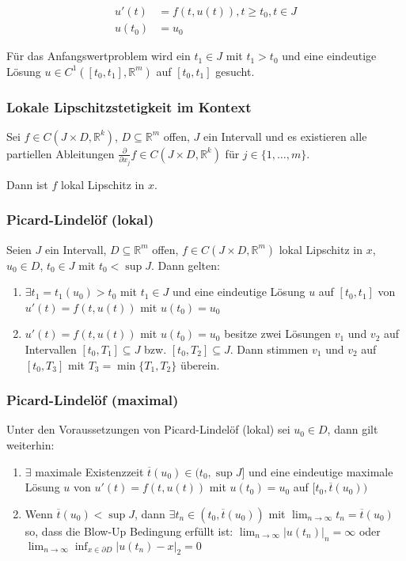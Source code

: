 \vspace*{-4mm}
\begin{align*}
	u'(t)  &= f(t, u(t)), t\geq t_0, t\in J \\
	u(t_0) &= u_0
\end{align*}

Für das Anfangswertproblem wird ein $t_1 \in J$ mit $t_1 > t_0$ und eine eindeutige Lösung $u \in C^1([t_0, t_1], \mathbb{R}^m)$ auf $[t_0, t_1]$ gesucht.

\subsubsection*{Lokale Lipschitzstetigkeit im Kontext}

Sei $f \in C(J \times D, \mathbb{R}^k)$, $D \subseteq \mathbb{R}^m$ offen, $J$ ein Intervall und es existieren alle partiellen Ableitungen $\frac{\partial}{\partial x_j} f \in C(J \times D, \mathbb{R}^k)$ für $j \in \{1, \hdots, m\}$.

Dann ist $f$ lokal Lipschitz in $x$.

\subsubsection*{Picard-Lindelöf (lokal)}

Seien $J$ ein Intervall, $D \subseteq \mathbb{R}^m$ offen, $f \in C(J \times D, \mathbb{R}^m)$ lokal Lipschitz in $x$, $u_0 \in D$, $t_0 \in J$ mit $t_0 < \sup J$. Dann gelten:

\begin{enumerate}[label=(\alph*)]
	\item $\exists t_1 = t_1(u_0) > t_0 $ mit $t_1 \in J$ und eine eindeutige Lösung $u$  auf $[t_0, t_1]$ von $u'(t) = f(t, u(t))$ mit $u(t_0) = u_0$
	\item $u'(t) = f(t, u(t))$ mit $u(t_0) = u_0$ besitze zwei Lösungen $v_1$ und $v_2$ auf Intervallen $[t_0, T_1] \subseteq J$ bzw. $[t_0, T_2] \subseteq J$. Dann stimmen $v_1$ und $v_2$ auf $[t_0, T_3]$ mit $T_3 = \min\{T_1, T_2\}$ überein.
\end{enumerate}

\subsubsection*{Picard-Lindelöf (maximal)}

Unter den Voraussetzungen von Picard-Lindelöf (lokal) sei $u_0 \in D$, dann gilt weiterhin:

\begin{enumerate}[label=(\alph*)]
	\item $\exists$ maximale Existenzzeit $\overline t(u_0) \in (t_0, \sup J]$ und eine eindeutige maximale Lösung $u$ von $u'(t) = f(t, u(t))$ mit $u(t_0) = u_0$ auf $[t_0, \overline t(u_0))$
	\item Wenn $\overline t(u_0) < \sup J$, dann $\exists t_n \in (t_0, \overline t(u_0))$ mit $\lim_{n \to \infty} t_n = \overline t(u_0)$ so, dass die Blow-Up Bedingung erfüllt ist: $\lim_{n \to \infty} |u(t_n)|_n = \infty$ oder $\lim_{n \to \infty} \inf_{x \in \partial D} |u(t_n) - x|_2 = 0$
\end{enumerate}

